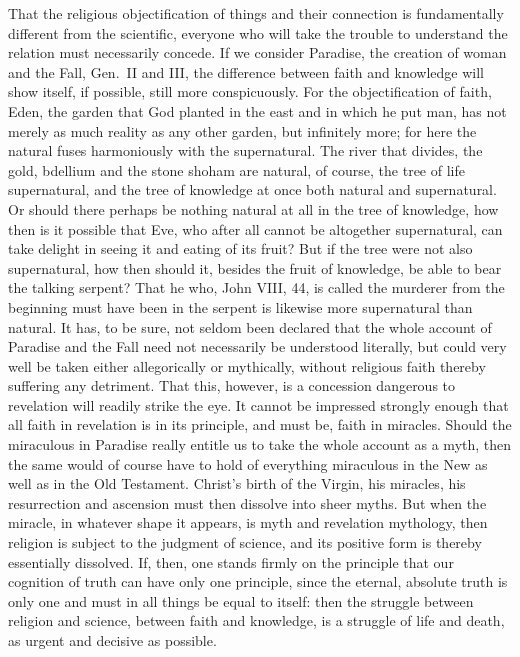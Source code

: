 \documentclass[12pt,a4paper]{article}
\newcommand{\opage}[1]{\marginnote{\footnotesize\textit{[#1]}}}
\begin{document}
That the religious objectification of things and their connection is
fundamentally different from the scientific, everyone who will take the
trouble to understand the relation must necessarily concede. If we
consider Paradise, the creation of woman and the Fall, Gen.\ II and III,
\opage{11}the difference between faith and knowledge will show itself, if possible,
still more conspicuously. For the objectification of faith, Eden,
the garden that God planted in the east and in which he put man,
has not merely as much reality as any other garden,
but infinitely more; for here the natural fuses harmoniously
with the supernatural. The river that divides, the gold,
bdellium and the stone shoham are natural, of course, the tree of life
supernatural, and the tree of knowledge at once both natural
and supernatural. Or should there perhaps be nothing natural at all
in the tree of knowledge, how then is it possible that Eve, who
after all cannot be altogether supernatural, can take delight in seeing
it and eating of its fruit? But if the tree were not also supernatural,
how then should it, besides the fruit of knowledge,
be able to bear the talking serpent? That he who, John VIII, 44, is called
the murderer from the beginning must have been in the serpent is
likewise more supernatural than natural. It has, to be sure, not seldom
been declared that the whole account of Paradise and the Fall need not
necessarily be understood literally, but could very well be
taken either allegorically or mythically, without religious faith
thereby suffering any detriment. That this, however, is a concession
dangerous to revelation will readily strike the eye. It
cannot be impressed strongly enough that all faith in revelation is in its principle,
and must be, faith in miracles. Should the miraculous in Paradise really
entitle us to take the whole account as a
myth, then the same would of course have to hold of everything
miraculous in the New as well as in the Old Testament. Christ's
birth of the Virgin, his miracles, his resurrection and ascension
must then dissolve into sheer myths. But when the miracle, in
whatever shape it appears, is myth and revelation
mythology, then religion is subject to the judgment of science, and
its positive form is thereby essentially dissolved. If, then, one stands
firmly on the principle that our cognition of truth can
have only one principle, since the eternal, absolute truth is only one
and must in all things be equal to itself: then the struggle between religion
\opage{12}and science, between faith and knowledge, is a struggle of life and death,
as urgent and decisive as possible.
\end{document}
